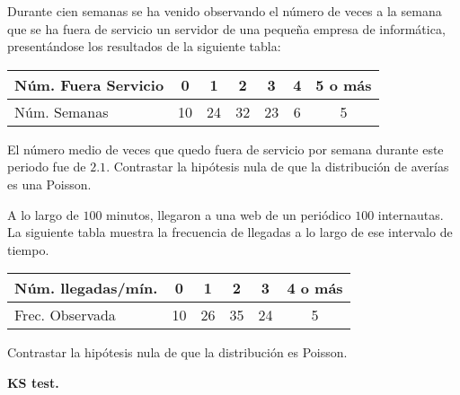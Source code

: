 \documentclass[12pt]{article}\usepackage[]{graphicx}\usepackage[]{color}
\begin{document}
\begin{prob}
Durante cien semanas se ha venido observando el número de veces a la semana que se ha fuera
de servicio  un servidor de una pequeña empresa de informática, presentándose los
resultados de la siguiente tabla:

\begin{tabular}{|l|cccccc|}
\hline
Núm. Fuera Servicio & 0 & 1 & 2 & 3 & 4 & 5 o más\\
\hline
Núm. Semanas & 10 & 24 & 32 & 23 & 6 & 5\\
\hline
\end{tabular}

El número medio de veces que quedo fuera de servicio por semana durante este periodo fue de
$2.1$. Contrastar la hipótesis nula de que la distribución de averías es una Poisson.
\end{prob}


\begin{prob}
A lo largo de $100$ minutos, llegaron a una web de un periódico $100$
internautas. La siguiente tabla muestra la frecuencia de llegadas a
lo largo de ese intervalo de tiempo.

\begin{tabular}{|l|ccccc|}
\hline
Núm. llegadas/mín. & 0 & 1 & 2 & 3 & 4 o más\\
\hline
Frec. Observada & 10 & 26& 35 & 24 & 5 \\
\hline
\end{tabular}

Contrastar la hipótesis nula de
que la distribución es Poisson.
\end{prob}




\textbf{KS test.}
\end{document}
